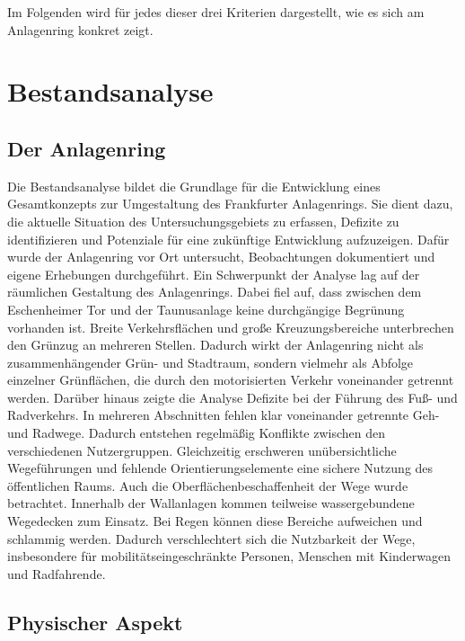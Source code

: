 \documentclass[a4paper,12pt]{article}
\begin{document}
Im Folgenden wird für jedes dieser drei Kriterien dargestellt, wie es sich am Anlagenring konkret zeigt.

\section{Bestandsanalyse}

\subsection{Der Anlagenring}

Die Bestandsanalyse bildet die Grundlage für die Entwicklung eines Gesamtkonzepts zur Umgestaltung des Frankfurter Anlagenrings. Sie dient dazu, die aktuelle Situation des Untersuchungsgebiets zu erfassen, Defizite zu identifizieren und Potenziale für eine zukünftige Entwicklung aufzuzeigen. Dafür wurde der Anlagenring vor Ort untersucht, Beobachtungen dokumentiert und eigene Erhebungen durchgeführt.
Ein Schwerpunkt der Analyse lag auf der räumlichen Gestaltung des Anlagenrings. Dabei fiel auf, dass zwischen dem Eschenheimer Tor und der Taunusanlage keine durchgängige Begrünung vorhanden ist. Breite Verkehrsflächen und große Kreuzungsbereiche unterbrechen den Grünzug an mehreren Stellen. Dadurch wirkt der Anlagenring nicht als zusammenhängender Grün- und Stadtraum, sondern vielmehr als Abfolge einzelner Grünflächen, die durch den motorisierten Verkehr voneinander getrennt werden.
Darüber hinaus zeigte die Analyse Defizite bei der Führung des Fuß- und Radverkehrs. In mehreren Abschnitten fehlen klar voneinander getrennte Geh- und Radwege. Dadurch entstehen regelmäßig Konflikte zwischen den verschiedenen Nutzergruppen. Gleichzeitig erschweren unübersichtliche Wegeführungen und fehlende Orientierungselemente eine sichere Nutzung des öffentlichen Raums.
Auch die Oberflächenbeschaffenheit der Wege wurde betrachtet. Innerhalb der Wallanlagen kommen teilweise wassergebundene Wegedecken zum Einsatz. Bei Regen können diese Bereiche aufweichen und schlammig werden. Dadurch verschlechtert sich die Nutzbarkeit der Wege, insbesondere für mobilitätseingeschränkte Personen, Menschen mit Kinderwagen und Radfahrende.


\subsection{Physischer Aspekt}
\end{document}
